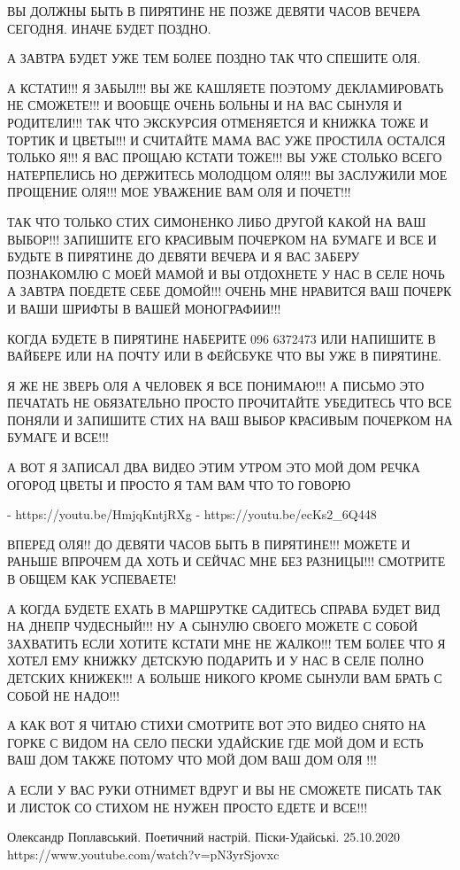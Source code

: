 ВЫ ДОЛЖНЫ БЫТЬ В ПИРЯТИНЕ НЕ ПОЗЖЕ ДЕВЯТИ ЧАСОВ ВЕЧЕРА СЕГОДНЯ. ИНАЧЕ БУДЕТ ПОЗДНО.

А ЗАВТРА БУДЕТ УЖЕ ТЕМ БОЛЕЕ ПОЗДНО ТАК ЧТО СПЕШИТЕ ОЛЯ.

А КСТАТИ!!! Я ЗАБЫЛ!!! ВЫ ЖЕ КАШЛЯЕТЕ ПОЭТОМУ ДЕКЛАМИРОВАТЬ НЕ СМОЖЕТЕ!!!
И ВООБЩЕ ОЧЕНЬ БОЛЬНЫ И НА ВАС СЫНУЛЯ И РОДИТЕЛИ!!! ТАК ЧТО ЭКСКУРСИЯ ОТМЕНЯЕТСЯ И КНИЖКА ТОЖЕ И ТОРТИК И ЦВЕТЫ!!!
И СЧИТАЙТЕ МАМА ВАС УЖЕ ПРОСТИЛА ОСТАЛСЯ ТОЛЬКО Я!!! Я ВАС ПРОЩАЮ КСТАТИ ТОЖЕ!!!
ВЫ УЖЕ СТОЛЬКО ВСЕГО НАТЕРПЕЛИСЬ НО ДЕРЖИТЕСЬ МОЛОДЦОМ ОЛЯ!!! 
ВЫ ЗАСЛУЖИЛИ МОЕ ПРОЩЕНИЕ ОЛЯ!!! МОЕ УВАЖЕНИЕ ВАМ ОЛЯ И ПОЧЕТ!!!

ТАК ЧТО ТОЛЬКО СТИХ СИМОНЕНКО ЛИБО ДРУГОЙ КАКОЙ НА ВАШ ВЫБОР!!! 
ЗАПИШИТЕ ЕГО КРАСИВЫМ ПОЧЕРКОМ НА БУМАГЕ И ВСЕ И БУДЬТЕ В ПИРЯТИНЕ ДО ДЕВЯТИ ВЕЧЕРА И Я ВАС
ЗАБЕРУ ПОЗНАКОМЛЮ С МОЕЙ МАМОЙ И ВЫ ОТДОХНЕТЕ У НАС В СЕЛЕ НОЧЬ А ЗАВТРА ПОЕДЕТЕ СЕБЕ ДОМОЙ!!!
ОЧЕНЬ МНЕ НРАВИТСЯ ВАШ ПОЧЕРК И ВАШИ ШРИФТЫ В ВАШЕЙ МОНОГРАФИИ!!!

КОГДА БУДЕТЕ В ПИРЯТИНЕ НАБЕРИТЕ 096 6372473 ИЛИ НАПИШИТЕ В ВАЙБЕРЕ ИЛИ НА
ПОЧТУ ИЛИ В ФЕЙСБУКЕ ЧТО ВЫ УЖЕ В ПИРЯТИНЕ.

Я ЖЕ НЕ ЗВЕРЬ ОЛЯ А ЧЕЛОВЕК Я ВСЕ ПОНИМАЮ!!! А ПИСЬМО ЭТО ПЕЧАТАТЬ НЕ ОБЯЗАТЕЛЬНО ПРОСТО
ПРОЧИТАЙТЕ УБЕДИТЕСЬ ЧТО ВСЕ ПОНЯЛИ И ЗАПИШИТЕ СТИХ НА ВАШ ВЫБОР КРАСИВЫМ ПОЧЕРКОМ НА БУМАГЕ И ВСЕ!!!

А ВОТ Я ЗАПИСАЛ ДВА ВИДЕО ЭТИМ УТРОМ ЭТО МОЙ ДОМ 
РЕЧКА ОГОРОД ЦВЕТЫ И ПРОСТО Я ТАМ ВАМ ЧТО ТО ГОВОРЮ

- https://youtu.be/HmjqKntjRXg
- https://youtu.be/ecKs2_6Q448

ВПЕРЕД ОЛЯ!! ДО ДЕВЯТИ ЧАСОВ БЫТЬ В ПИРЯТИНЕ!!! 
МОЖЕТЕ И РАНЬШЕ ВПРОЧЕМ ДА ХОТЬ И СЕЙЧАС МНЕ БЕЗ РАЗНИЦЫ!!!
СМОТРИТЕ В ОБЩЕМ КАК УСПЕВАЕТЕ!

А КОГДА БУДЕТЕ ЕХАТЬ В МАРШРУТКЕ САДИТЕСЬ СПРАВА БУДЕТ ВИД НА ДНЕПР ЧУДЕСНЫЙ!!!
НУ А СЫНУЛЮ СВОЕГО МОЖЕТЕ С СОБОЙ ЗАХВАТИТЬ ЕСЛИ ХОТИТЕ КСТАТИ МНЕ НЕ ЖАЛКО!!!
ТЕМ БОЛЕЕ ЧТО Я ХОТЕЛ ЕМУ КНИЖКУ ДЕТСКУЮ ПОДАРИТЬ И У НАС В СЕЛЕ ПОЛНО 
ДЕТСКИХ КНИЖЕК!!! А БОЛЬШЕ НИКОГО КРОМЕ СЫНУЛИ ВАМ БРАТЬ С СОБОЙ НЕ НАДО!!!

А КАК ВОТ Я ЧИТАЮ СТИХИ СМОТРИТЕ ВОТ ЭТО ВИДЕО 
СНЯТО НА ГОРКЕ С ВИДОМ НА СЕЛО ПЕСКИ УДАЙСКИЕ ГДЕ МОЙ ДОМ 
И ЕСТЬ ВАШ ДОМ ТАКЖЕ ПОТОМУ ЧТО МОЙ ДОМ ВАШ ДОМ ОЛЯ !!!

А ЕСЛИ У ВАС РУКИ ОТНИМЕТ ВДРУГ И ВЫ НЕ СМОЖЕТЕ ПИСАТЬ ТАК И ЛИСТОК СО СТИХОМ 
НЕ НУЖЕН ПРОСТО ЕДЕТЕ И ВСЕ!!!

Олександр Поплавський. Поетичний настрій. Піски-Удайські. 25.10.2020
https://www.youtube.com/watch?v=pN3yrSjovxc
